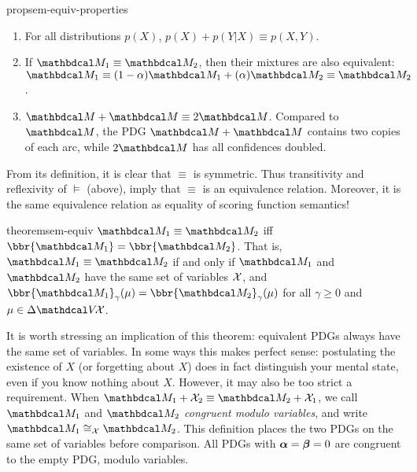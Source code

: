     \begin{linked}{prop}{sem-equiv-properties}
        \begin{enumerate}[parsep=0pt]
        \item For all distributions $p(X)$, $p(X) + p(Y|X) \equiv p(X,Y)$. 
        \item If $\dg M_1 \equiv \dg M_2$, then their mixtures are also equivalent:
            $\dg M_1 \equiv (1-\alpha) \dg M_1 + (\alpha) \dg M_2 \equiv \dg M_2$. 
        \item $\dg M + \dg M \equiv 2 \dg M$. 
            Compared to $\dg M$, the PDG $\dg M + \dg M$ contains two copies of each arc, while $2 \dg M$ has all confidences doubled. 
    \end{enumerate}
    \end{linked}

From its definition, it is clear that $\equiv$ is symmetric.
Thus transitivity and reflexivity of $\models$ (above), imply that
$\equiv$ is an equivalence relation. Moreover, it is the same equivalence relation as equality of scoring function semantics!

\begin{linked}{theorem}{sem-equiv}
    $\dg M_1 \equiv \dg M_2$ iff $\bbr{\dg M_1} = \bbr{\dg M_2}$.
    That is, $\dg M_1 \equiv \dg M_2$ if and only if 
    $\dg M_1$ and $\dg M_2$ have the same set of variables $\mathcal X$, and
    $\bbr{\dg M_1}_\gamma(\mu) = \bbr{\dg M_2}_\gamma(\mu)$
    for all $\gamma \ge 0$ and $\mu \in \Delta\V\!\X$.
\end{linked}    


It is worth stressing an implication of this theorem: equivalent PDGs always have the same set of variables.
In some ways this makes perfect sense: postulating the existence of $X$ (or forgetting about $X$) does in fact distinguish your mental state, even if you know nothing about $X$. 
However, it may also be too strict a requirement.
    When $\dg M_1 + \X_2 \equiv \dg M_2 + \X_1$,
    we call $\dg M_1$ and $\dg M_2$ \emph{congruent modulo variables}, and write $\dg M_1 \cong_\X \dg M_2$.
    This definition places the two PDGs on the same set of variables before comparison.  All PDGs with $\boldsymbol\alpha = \boldsymbol\beta = 0$ are congruent to the empty PDG, modulo variables. 



